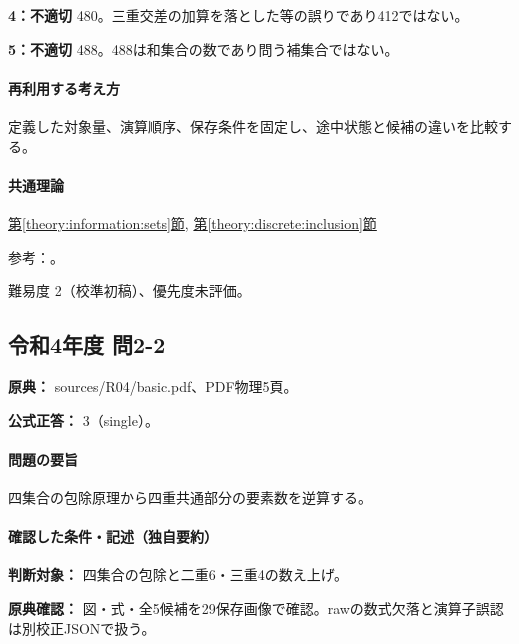 \noindent\textbf{4：不適切} 480。三重交差の加算を落とした等の誤りであり412ではない。\par

\noindent\textbf{5：不適切} 488。488は和集合の数であり問う補集合ではない。\par

\paragraph{再利用する考え方} 定義した対象量、演算順序、保存条件を固定し、途中状態と候補の違いを比較する。

\paragraph{共通理論} \hyperref[theory:information:sets]{第\ref*{theory:information:sets}節}, \hyperref[theory:discrete:inclusion]{第\ref*{theory:discrete:inclusion}節}

\par 参考：\cite{mit_discrete2015}。

\par 難易度 2（校準初稿）、優先度未評価。

\subsection{令和4年度 問2-2}
\label{q:r04-reg-basic-2-2}

\noindent\textbf{原典：} sources/R04/basic.pdf、PDF物理5頁。

\textbf{公式正答：} 3（single）。

\paragraph{問題の要旨} 四集合の包除原理から四重共通部分の要素数を逆算する。

\paragraph{確認した条件・記述（独自要約）}\mbox{}\par

\noindent\textbf{判断対象：} 四集合の包除と二重6・三重4の数え上げ。\par

\noindent\textbf{原典確認：} 図・式・全5候補を29保存画像で確認。rawの数式欠落と演算子誤認は別校正JSONで扱う。\par

